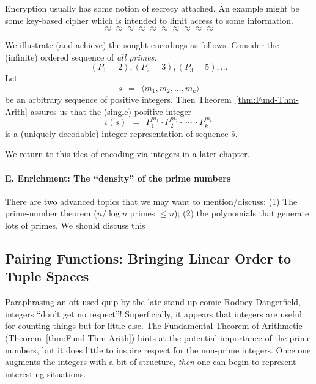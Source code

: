 Encryption usually has some notion of secrecy attached.  An example
might be some key-based cipher which is intended to limit access to
some information.
\[ \approx \approx \approx \approx \approx \approx \approx \approx \approx \approx \]

We illustrate (and achieve) the sought encodings as follows.  Consider
the (infinite) ordered sequence of {\em all primes:}
\[ (P_1 = 2), (P_2 = 3), (P_3 = 5), \ldots  \]
Let
\begin{equation}
\label{eq:sequence-vec-s}
\bar{s} \ \ = \ \ \langle m_1, m_2, \ldots, m_k \rangle
\end{equation}
be an arbitrary sequence of positive integers.  Then
Theorem~\ref{thm:Fund-Thm-Arith} assures us that the (single) positive
integer
\[ 
\iota(\bar{s}) \ \ = \ \ P_1^{m_1} \cdot P_2^{m_2} \cdot \ \cdots \
\cdot P_k^{m_k}
\]
is a (uniquely decodable) integer-representation of sequence $\bar{s}$.

We return to this idea of encoding-via-integers in a later chapter.

\paragraph{\small\sf E. Enrichment: The ``density'' of the prime numbers}

{\Arny There are two advanced topics that we may want to
  mention/discuss: (1) The prime-number theorem ($n/ \log n$ primes
  $\leq n$); (2) the polynomials that generate lots of primes.  We
  should discuss this}


\subsection{Pairing Functions: Bringing Linear Order to Tuple Spaces}
\label{sec:pairing}

Paraphrasing an oft-used quip by the late stand-up comic Rodney
Dangerfield, integers ``don't get no respect''!  Superficially, it
appears that integers are useful for counting things but for little
else.  The Fundamental Theorem of Arithmetic
(Theorem~\ref{thm:Fund-Thm-Arith}) hints at the potential importance
of the prime numbers, but it does little to inspire respect for the
non-prime integers.  Once one augments the integers with a bit of
structure, {\em then} one can begin to represent interesting
situations.

